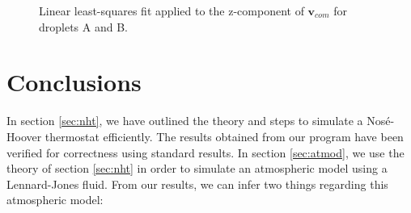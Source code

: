 \documentclass[a4paper,10pt]{article}
\begin{document}
\begin{figure}[htp]
\centering
{}
\caption{Linear least-squares fit applied to the z-component of $\mathbf{v}_{com}$ for droplets A and B.}
\label{fig:tevol2}
\end{figure}

\section{Conclusions}
\label{sec:conclusions}

In section \ref{sec:nht}, we have outlined the theory and steps to simulate a Nos\'{e}-Hoover thermostat efficiently. The results obtained from our program have been verified for correctness using standard results. In section \ref{sec:atmod}, we use the theory of section \ref{sec:nht} in order to simulate an atmospheric model using a Lennard-Jones fluid. From our results, we can infer two things regarding this atmospheric model:
\end{document}
